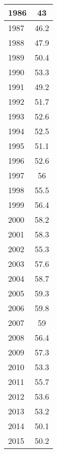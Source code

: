 \documentclass{mcmthesis}
\begin{document}
\begin{appendices}
\begin{minipage}{\textwidth}
\begin{minipage}[t]{0.45\textwidth}
\begin{tabular}{|l|c|}
            1986 & 43                         \\ \hline
            1987 & 46.2                       \\ \hline
            1988 & 47.9                       \\ \hline
            1989 & 50.4                       \\ \hline
            1990 & 53.3                       \\ \hline
            1991 & 49.2                       \\ \hline
            1992 & 51.7                       \\ \hline
            1993 & 52.6                       \\ \hline
            1994 & 52.5                       \\ \hline
            1995 & 51.1                       \\ \hline
            1996 & 52.6                       \\ \hline
            1997 & 56                         \\ \hline
            1998 & 55.5                       \\ \hline
            1999 & 56.4                       \\ \hline
            2000 & 58.2                       \\ \hline
            2001 & 58.3                       \\ \hline
            2002 & 55.3                       \\ \hline
            2003 & 57.6                       \\ \hline
            2004 & 58.7                       \\ \hline
            2005 & 59.3                       \\ \hline
            2006 & 59.8                       \\ \hline
            2007 & 59                         \\ \hline
            2008 & 56.4                       \\ \hline
            2009 & 57.3                       \\ \hline
            2010 & 53.3                       \\ \hline
            2011 & 55.7                       \\ \hline
            2012 & 53.6                       \\ \hline
            2013 & 53.2                       \\ \hline
            2014 & 50.1                       \\ \hline
            2015 & 50.2                       \\ \hline
            \end{tabular}
  \end{minipage}
\end{minipage}


\end{appendices}
\end{document}
